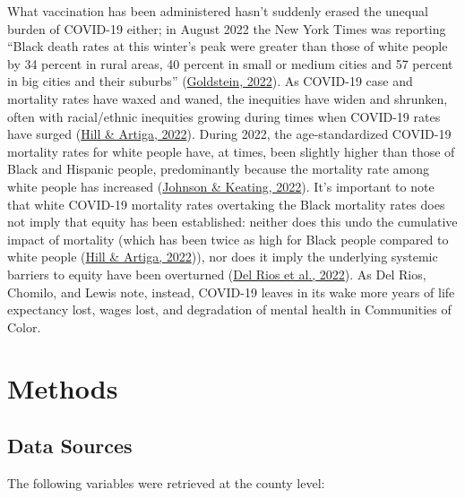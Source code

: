 \documentclass[
]{article}
\begin{document}
What vaccination has been administered hasn't suddenly erased the unequal burden
of COVID-19 either; in August 2022 the New York Times was reporting ``Black death
rates at this winter's peak were greater than those of white people by 34
percent in rural areas, 40 percent in small or medium cities and 57 percent in
big cities and their suburbs'' (\protect\hyperlink{ref-goldstein_during_2022}{Goldstein, 2022}). As COVID-19 case and
mortality rates have waxed and waned, the inequities have widen and shrunken,
often with racial/ethnic inequities growing during times when COVID-19 rates
have surged (\protect\hyperlink{ref-hill_covid-19_2022}{Hill \& Artiga, 2022}). During 2022, the age-standardized
COVID-19 mortality rates for white people have, at times, been slightly
higher than those of Black and Hispanic people, predominantly because the
mortality rate among white people has increased (\protect\hyperlink{ref-johnson_whites_2022}{Johnson \& Keating, 2022}).
It's important to note that white COVID-19 mortality rates overtaking
the Black mortality rates does not imply that equity has been established: neither
does this undo the cumulative impact of mortality (which has been twice as high for
Black people compared to white people (\protect\hyperlink{ref-hill_covid-19_2022}{Hill \& Artiga, 2022})), nor does it imply
the underlying systemic barriers to equity have been overturned
(\protect\hyperlink{ref-del_rios_covid-19_2022}{Del Rios et al., 2022}). As Del Rios, Chomilo, and Lewis note, instead,
COVID-19 leaves in its wake more years of life expectancy lost, wages lost, and
degradation of mental health in Communities of Color.

\hypertarget{methods}{%
\section{Methods}\label{methods}}

\hypertarget{data-sources}{%
\subsection{Data Sources}\label{data-sources}}

The following variables were retrieved at the county level:
\end{document}
